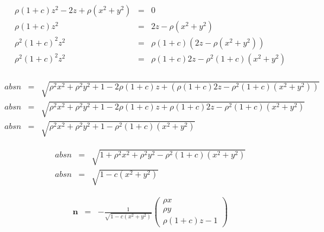 \documentclass[12pt,a4paper,twoside,openright,BCOR10mm,headsepline,titlepage,abstracton,chapterprefix,final]{scrreprt}
\newcommand\Vector[1]{{\mathbf{#1}}}
\begin{document}
\begin{align}
 \rho (1 + c) z^2 - 2 z + \rho (x^2 + y^2) &=& 0 \\
 \rho (1 + c) z^2  &=&  2 z - \rho (x^2 + y^2) \\
 \rho^2 (1 + c)^2 z^2  &=&  \rho ( 1+c) \left( 2 z - \rho (x^2 + y^2) \right) \\
 \rho^2 (1 + c)^2 z^2  &=&  \rho ( 1+c)  2 z - \rho^2 ( 1+c) (x^2 + y^2)   \\
\end{align}

\begin{align}
 absn &=& \sqrt{ \rho^2 x^2 + \rho^2 y^2 + 1 - 2 \rho ( 1 + c ) z + \left( \rho ( 1+c)  2 z - \rho^2 ( 1+c) (x^2 + y^2) \right) } \\
 absn &=& \sqrt{ \rho^2 x^2 + \rho^2 y^2 + 1 - 2 \rho ( 1 + c ) z + \rho ( 1+c)  2 z - \rho^2 ( 1+c) (x^2 + y^2) } \\
 absn &=& \sqrt{ \rho^2 x^2 + \rho^2 y^2 + 1 - \rho^2 ( 1+c) (x^2 + y^2) }
\end{align}

\begin{align}
 absn &=& \sqrt{ 1 + \rho^2 x^2 + \rho^2 y^2  - \rho^2 ( 1+c) (x^2 + y^2) } \\
 absn &=& \sqrt{ 1 - c (x^2 + y^2) }
\end{align}


\begin{eqnarray}
\Vector{n} &=& - \frac{1}{\sqrt{ 1 - c (x^2 + y^2)}} 
  \begin{pmatrix}
   \rho x \\
   \rho y \\
   \rho ( 1 + c ) z - 1
  \end{pmatrix}
\end{eqnarray}
\end{document}
